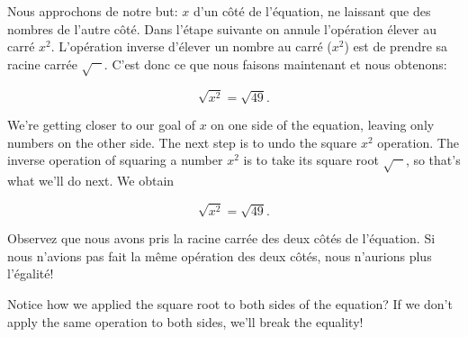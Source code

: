 \begin{paracol}{2}

	\begin{leftcolumn*}

		\begin{otherlanguage}{french}
	Nous approchons de notre but:  $x$ d'un côté de l'équation,
	ne laissant que des nombres de l'autre côté.
	Dans l'étape suivante on annule l'opération élever au carré $x^2$.
	L'opération inverse d'élever un nombre au carré ($x^2$) est de prendre sa racine carrée $\sqrt{\phantom{a}\ }$.
	C'est donc ce que nous faisons maintenant et nous obtenons:

	\[ 
	   \sqrt{x^2} 		= 	\sqrt{49}.
	\]
		\end{otherlanguage}

	\end{leftcolumn*}



	\begin{rightcolumn}

	We're getting closer to our goal of  $x$ on one side of the equation,
	leaving only numbers on the other side.
	The next step is to undo the square $x^2$ operation.
	The inverse operation of squaring a number $x^2$ is to take its square root $\sqrt{\phantom{a}\ }$,
	so that's what we'll do next. We obtain

	\[ 
	   \sqrt{x^2} 		= 	\sqrt{49}.
	\]

	\end{rightcolumn}

\end{paracol}


\begin{paracol}{2}

	\begin{leftcolumn*}

		\begin{otherlanguage}{french}
	Observez que nous avons pris la racine carrée des deux côtés de l'équation.
	Si nous n'avions pas fait la même opération des deux côtés, nous n'aurions plus l'égalité!


		\end{otherlanguage}

	\end{leftcolumn*}



	\begin{rightcolumn}

	Notice how we applied the square root  to both sides of the equation? 
	If we don't apply the same operation to both sides, we'll break the equality!



	\end{rightcolumn}

\end{paracol}

